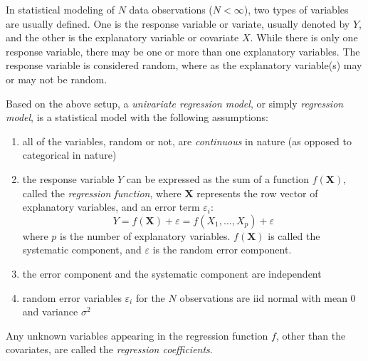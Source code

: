 \documentclass[12pt]{article}
\begin{document}

In statistical modeling of $N$ data observations ($N<\infty$), two types of variables are usually defined.  One is the response variable or variate, usually denoted by $Y$, and the other is the explanatory variable or covariate $X$.  While there is only one response variable, there may be one or more than one explanatory variables.  The response variable is considered random, where as the explanatory variable(s) may or may not be random. 
 
Based on the above setup, a \emph{univariate regression model}, or simply \emph{regression model}, is a statistical model with the following assumptions:
\begin{enumerate}
\item all of the variables, random or not, are \emph{continuous} in nature (as opposed to categorical in nature)
\item the response variable $Y$ can be expressed as the sum of a function $f(\textbf{X})$, called the \emph{regression function}, where $\textbf{X}$ represents the row vector of explanatory variables, and an error term $\varepsilon_i$:  
$$Y=f(\textbf{X})+\varepsilon=f(X_1,\ldots,X_p)+\varepsilon$$
where $p$ is the number of explanatory variables.  $f(\textbf{X})$ is called the systematic component, and $\varepsilon$ is the random error component.
\item the error component and the systematic component are independent
\item random error variables $\varepsilon_i$ for the $N$ observations are iid normal with mean 0 and variance $\sigma^2$
\end{enumerate}

Any unknown variables appearing in the regression function $f$, other than the covariates, are called the \emph{regression coefficients}.
\end{document}
